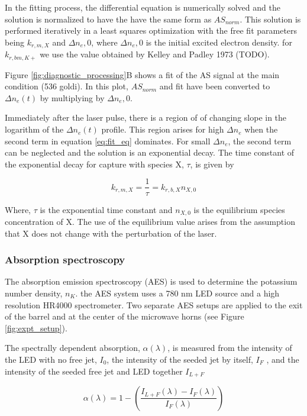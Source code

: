 In the fitting process, the differential equation is numerically solved and the solution is normalized to have the have the same form as $AS_{norm}$. This solution is performed iteratively in a least squares optimization with the free fit parameters being $k_{r,m,X}$ and $\Delta{n_e,0}$, where $\Delta{n_e,0}$ is the initial excited electron density. for $k_{r, bm, K+}$ we use the value obtained by Kelley and Padley 1973 (TODO).

Figure \ref{fig:diagnostic_processing}B shows a fit of the AS signal at the main condition (536 goldi). In this plot, $AS_{norm}$ and fit have been converted to $\Delta n_e (t)$ by multiplying by $\Delta{n_e,0}$. 

Immediately after the laser pulse, there is a region of of changing slope in the logarithm of the $\Delta n_e (t)$ profile. This region arises for high $\Delta n_e$ when the second term in equation \ref{eq:fit_eq} dominates.  For small $\Delta n_e$, the second term can be neglected and the solution is an exponential decay. The time constant of the exponential decay for capture with species X, $\tau$, is given by

\begin{equation}
    k_{r, m, X} = \frac{1}{\tau} = k_{r, b, X}n_{X,0}
\end{equation}

Where, $\tau$ is the exponential time constant and $n_{X,0}$ is the equilibrium species concentration of X. The use of the equilibrium value arises from the assumption that X does not change with the perturbation of the laser.

\subsubsection{Absorption spectroscopy}

The absorption emission spectroscopy (AES) is used to determine the potassium number density, $n_K$. the AES system uses a 780 nm LED source and a high resolution HR4000 spectrometer. Two separate AES setups are applied to the exit of the barrel and at the center of the microwave horns (see Figure \ref{fig:expt_setup}).

The spectrally dependent absorption, $\alpha(\lambda)$, is measured from the intensity of the LED with no free jet, $I_0$, the intensity of the seeded jet by itself, $I_F$ , and the intensity of the seeded free jet and LED together $I_{L+F}$


\begin{equation}
    \alpha(\lambda) = 1 - \left(\frac{I_{L+F}(\lambda) - I_{F}(\lambda)}{I_F(\lambda)}\right)
\end{equation}


